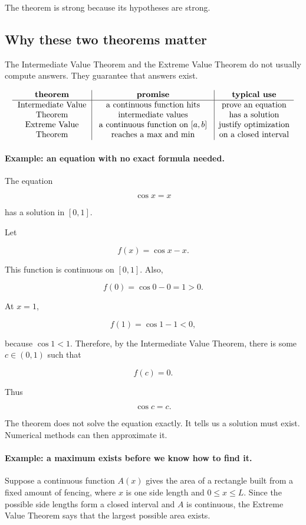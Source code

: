 The theorem is strong because its hypotheses are strong.

\subsection{Why these two theorems matter}
\label{subsec:why-ivt-evt-matter}

The Intermediate Value Theorem and the Extreme Value Theorem do not usually compute answers.  They guarantee that answers exist.

\[
\begin{array}{>{\centering\arraybackslash}p{0.25\textwidth}|>{\centering\arraybackslash}p{0.4\textwidth}|>{\centering\arraybackslash}p{0.25\textwidth}}
\textbf{theorem} & \textbf{promise} & \textbf{typical use} \\ \hline
Intermediate Value Theorem &
a continuous function hits intermediate values &
prove an equation has a solution \\[4pt]
Extreme Value Theorem &
a continuous function on \([a,b]\) reaches a max and min &
justify optimization on a closed interval
\end{array}
\]

\paragraph{Example: an equation with no exact formula needed.}
The equation

\[
\cos x=x
\]

has a solution in \([0,1]\).

Let

\[
f(x)=\cos x-x.
\]

This function is continuous on \([0,1]\).  Also,

\[
f(0)=\cos0-0=1>0.
\]

At \(x=1\),

\[
f(1)=\cos1-1<0,
\]

because \(\cos1<1\).  Therefore, by the Intermediate Value Theorem, there is some \(c\in(0,1)\) such that

\[
f(c)=0.
\]

Thus

\[
\cos c=c.
\]

The theorem does not solve the equation exactly.  It tells us a solution must exist.  Numerical methods can then approximate it.

\paragraph{Example: a maximum exists before we know how to find it.}
Suppose a continuous function \(A(x)\) gives the area of a rectangle built from a fixed amount of fencing, where \(x\) is one side length and \(0\le x\le L\).  Since the possible side lengths form a closed interval and \(A\) is continuous, the Extreme Value Theorem says that the largest possible area exists.

